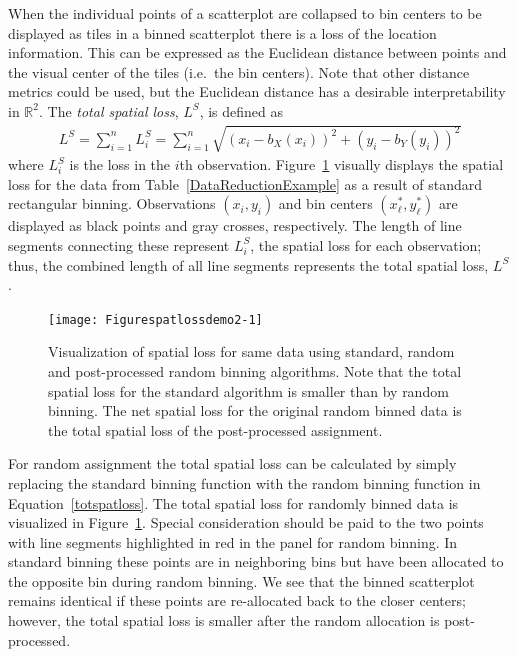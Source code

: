 \documentclass[11pt]{isuthesis}\usepackage[]{graphicx}\usepackage[]{color}
\newenvironment{knitrout}{}{} %
\begin{document}
When the individual points of a scatterplot are collapsed to bin centers to be displayed as tiles in a binned scatterplot there is a loss of the location information.  This can be expressed as the Euclidean distance between points and the visual center of the tiles (i.e.\ the bin centers). Note that other distance metrics could be used, but the Euclidean distance has a desirable interpretability in $\mathbb{R}^2$. The \textit{total spatial loss}, $L^S$, is defined as 
\begin{eqnarray}\label{totspatloss}
L^S = \sum_{i=1}^{n} L_i^S = \sum_{i=1}^{n} \sqrt{ \left(x_i-b_X(x_i)\right)^2 + \left(y_i-b_Y(y_i)\right)^2 }
\end{eqnarray} 
%
where $L_i^S$ is the loss in the  $i$th observation. 
%
Figure~\ref{fig:spatlossdemo2} visually displays the spatial loss for the data from  Table~\ref{DataReductionExample} as a result of standard rectangular binning. Observations $(x_i,y_i)$ and bin centers $\left(x_\ell^\ast,y_\ell^\ast\right)$ are displayed as black points and gray crosses, respectively. The length of line segments connecting these represent $L^S_i$, the spatial loss for each observation; thus, the combined length of all line segments represents the total spatial loss, $L^S$.  

\begin{knitrout}
\color{fgcolor}\begin{figure}[h]

{\centering \texttt{[image: Figurespatlossdemo2-1]} 

}

\caption[Visualization of spatial loss for same data using standard, random and post-processed random binning algorithms]{Visualization of spatial loss for same data using standard, random and post-processed random binning algorithms.  Note that the total spatial loss for the standard algorithm is smaller than by random binning. The net spatial loss for the original random binned data is the total spatial loss of the post-processed assignment.}\label{fig:spatlossdemo2}
\end{figure}


\end{knitrout}

For random assignment the total spatial loss can be calculated by simply replacing the standard binning function with the random binning function in Equation~\ref{totspatloss}. The total spatial loss for randomly binned data is visualized in Figure~\ref{fig:spatlossdemo2}. Special consideration should be paid to the two points with line segments highlighted in red in the panel for random binning. In standard binning these points are in neighboring bins but have been allocated to the opposite bin during random binning. We see that the binned scatterplot remains identical if these points are re-allocated back to the closer centers; however, the total spatial loss is smaller after the random allocation is post-processed.  
\end{document}
